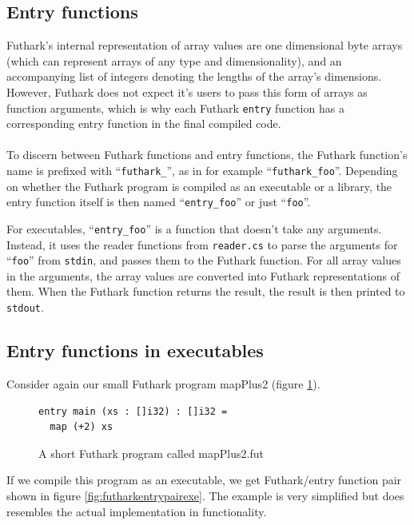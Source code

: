 \begin{description}
\subsection{Entry functions}
\label{csharpentries}
Futhark's internal representation of array values are one dimensional byte
arrays (which can represent arrays of any type and dimensionality), and an
accompanying list of integers denoting the lengths of the array's dimensions.
However, Futhark does not expect it's users to pass this form of arrays as
function arguments, which is why each Futhark \texttt{entry} function has a
corresponding entry function in the final compiled code.
\\\\
To discern between Futhark functions and entry functions, the Futhark function's
name is prefixed with ``\texttt{futhark\_}'', as in for example
``\texttt{futhark\_foo}''.
Depending on whether the Futhark program is compiled as an executable or a
library, the entry function itself is then named ``\texttt{entry\_foo}'' or
just ``\texttt{foo}''.

For executables, ``\texttt{entry\_foo}'' is a function that doesn't take any
arguments. Instead, it uses the reader functions from \texttt{reader.cs} to parse the
arguments for ``\texttt{foo}'' from \texttt{stdin}, and passes them to the
Futhark function. For all array values in the arguments, the array values are
converted into Futhark representations of them.
When the Futhark function returns the result, the result is then printed to \texttt{stdout}.

\subsection{Entry functions in executables}
\label{entryfunctionsinexecutables}
Consider again our small Futhark program mapPlus2 (figure \ref{fig:mapplus20}).
\begin{figure}[H]
  \centering
  \begin{lstlisting}[language=Futhark]
entry main (xs : []i32) : []i32 =
  map (+2) xs
  \end{lstlisting}
  \caption{A short Futhark program called mapPlus2.fut}
  \label{fig:mapplus20}
\end{figure}

If we compile this program as an executable, we get Futhark/entry function pair
shown in figure \ref{fig:futharkentrypairexe}. The example is very simplified
but does resembles the actual implementation in functionality.


\end{description}
